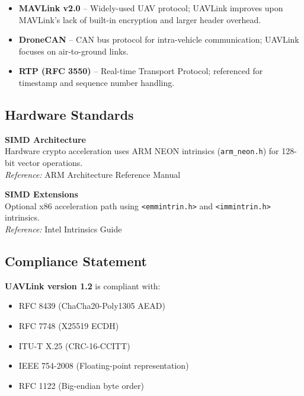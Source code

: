 \documentclass[11pt,a4paper]{article}
\begin{document}
\begin{itemize}[noitemsep]
\item \textbf{MAVLink v2.0} -- Widely-used UAV protocol; UAVLink improves upon MAVLink's lack of built-in encryption and larger header overhead.
\item \textbf{DroneCAN} -- CAN bus protocol for intra-vehicle communication; UAVLink focuses on air-to-ground links.
\item \textbf{RTP (RFC 3550)} -- Real-time Transport Protocol; referenced for timestamp and sequence number handling.
\end{itemize}

\subsection{Hardware Standards}

\begin{description}[style=nextline]
\item[ARM NEON] \textbf{SIMD Architecture} \\
Hardware crypto acceleration uses ARM NEON intrinsics (\texttt{arm\_neon.h}) for 128-bit vector operations.\\
\textit{Reference:} ARM Architecture Reference Manual

\item[Intel x86 SSE2/AVX2] \textbf{SIMD Extensions} \\
Optional x86 acceleration path using \texttt{<emmintrin.h>} and \texttt{<immintrin.h>} intrinsics.\\
\textit{Reference:} Intel Intrinsics Guide
\end{description}

\subsection{Compliance Statement}

\textbf{UAVLink version 1.2} is compliant with:
\begin{itemize}[noitemsep]
\item RFC 8439 (ChaCha20-Poly1305 AEAD)
\item RFC 7748 (X25519 ECDH)
\item ITU-T X.25 (CRC-16-CCITT)
\item IEEE 754-2008 (Floating-point representation)
\item RFC 1122 (Big-endian byte order)
\end{itemize}

\vspace{0.5cm}
\end{document}
